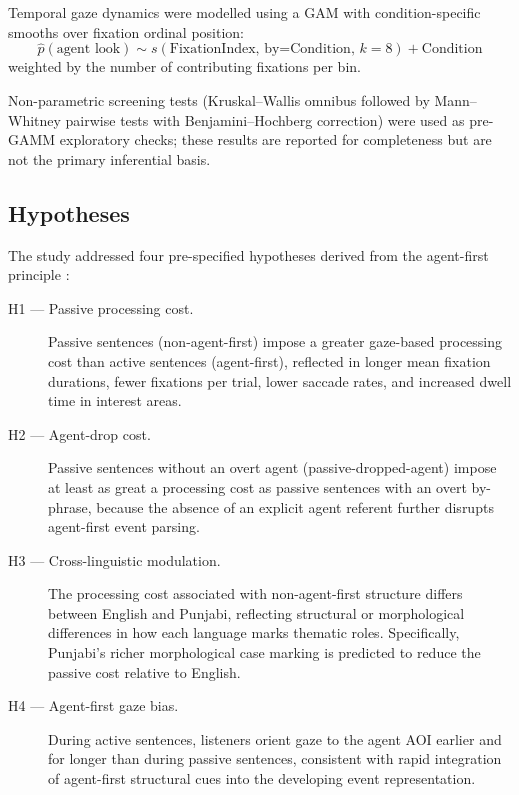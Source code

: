 \documentclass[12pt, a4paper]{article}
\begin{document}
Temporal gaze dynamics were modelled using a GAM with condition-specific
smooths over fixation ordinal position:
\begin{equation}
  \hat{p}(\text{agent look}) \sim
    s(\text{FixationIndex}, \, \text{by=Condition}, \, k = 8)
    + \text{Condition}
\end{equation}
weighted by the number of contributing fixations per bin.

Non-parametric screening tests (Kruskal--Wallis omnibus followed by
Mann--Whitney pairwise tests with Benjamini--Hochberg correction) were
used as pre-GAMM exploratory checks; these results are reported for
completeness but are not the primary inferential basis.

\subsection{Hypotheses}

The study addressed four pre-specified hypotheses derived from the
agent-first principle \citep[e.g.,][]{MacWhinney1982, Gernsbacher1990}:

\begin{description}
  \item[H1 — Passive processing cost.]
        Passive sentences (non-agent-first) impose a greater gaze-based
        processing cost than active sentences (agent-first), reflected in
        longer mean fixation durations, fewer fixations per trial, lower
        saccade rates, and increased dwell time in interest areas.
  \item[H2 — Agent-drop cost.]
        Passive sentences without an overt agent (passive-dropped-agent)
        impose at least as great a processing cost as passive sentences
        with an overt by-phrase, because the absence of an explicit agent
        referent further disrupts agent-first event parsing.
  \item[H3 — Cross-linguistic modulation.]
        The processing cost associated with non-agent-first structure
        differs between English and Punjabi, reflecting structural or
        morphological differences in how each language marks thematic roles.
        Specifically, Punjabi's richer morphological case marking is
        predicted to reduce the passive cost relative to English.
  \item[H4 — Agent-first gaze bias.]
        During active sentences, listeners orient gaze to the agent AOI
        earlier and for longer than during passive sentences,
        consistent with rapid integration of agent-first structural cues
        into the developing event representation.
\end{description}
\end{document}
